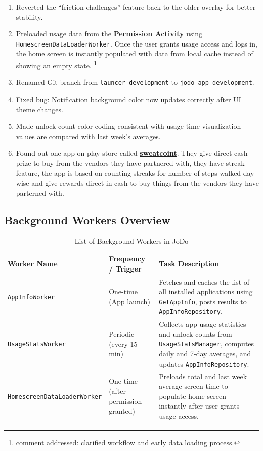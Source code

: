 \documentclass[12pt]{article}
\begin{document}
\begin{enumerate}
        \item Reverted the “friction challenges” feature back to the older overlay for better stability.
        \item Preloaded usage data from the \textbf{Permission Activity} using \texttt{HomescreenDataLoaderWorker}. Once the user grants usage access and logs in, the home screen is instantly populated with data from local cache instead of showing an empty state. \footnote{comment addressed: clarified workflow and early data loading process.}
        \item Renamed Git branch from \texttt{launcer-development} to \texttt{jodo-app-development}.
        \item Fixed bug: Notification background color now updates correctly after UI theme changes.
        \item Made unlock count color coding consistent with usage time visualization—values are compared with last week’s averages.
        \item Found out one app on play store called \href{https://play.google.com/store/apps/details?id=in.sweatco.app&hl=en_IN}{\textbf{sweatcoint}}. They give direct cash prize to buy from the vendors they have partnered with, they have streak feature, the app is based on counting streaks for number of steps walked day wise and give rewards direct in cash to buy things from the vendors they have parterned with. 
    \end{enumerate}
    
    \subsection{Background Workers Overview}
    \begin{table}[H]
    \centering
    \caption{List of Background Workers in JoDo}
    \label{tab:workers}
    \begin{tabularx}{\textwidth}{|l|X|X|}
    \hline
    \textbf{Worker Name} & \textbf{Frequency / Trigger} & \textbf{Task Description} \\ \hline
    \texttt{AppInfoWorker} & One-time (App launch) & Fetches and caches the list of all installed applications using \texttt{GetAppInfo}, posts results to \texttt{AppInfoRepository}. \\ \hline
    \texttt{UsageStatsWorker} & Periodic (every 15 min) & Collects app usage statistics and unlock counts from \texttt{UsageStatsManager}, computes daily and 7-day averages, and updates \texttt{AppInfoRepository}. \\ \hline
    \texttt{HomescreenDataLoaderWorker} & One-time (after permission granted) & Preloads total and last week average screen time to populate home screen instantly after user grants usage access. \\ \hline
    \end{tabularx}
    \end{table}
    
\end{document}
